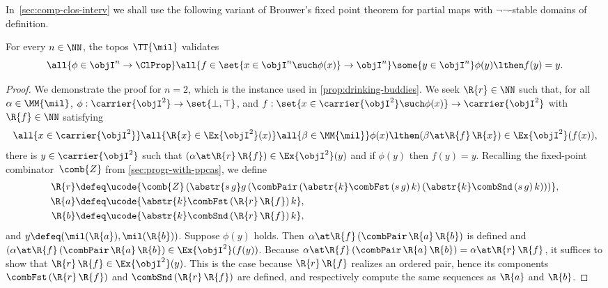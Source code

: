 In~\cref{sec:comp-clos-interv} we shall use the following variant of Brouwer's fixed point theorem for partial maps with $\neg\neg$-stable domains of definition.

\begin{theorem}
  \label{thm:partial-brouwer}%
  For every $n \in \NN$, the topos $\TT{\mil}$ validates
  \begin{equation*}
    \all{\phi \in \objI^n \to \ClProp}
    \all{f \in {\set{x \in \objI^n \such \phi(x)}} \to \objI^n}
    \some{y \in \objI^n}
    \phi(y) \lthen f(y) = y.
  \end{equation*}
\end{theorem}

\begin{proof}
  We demonstrate the proof for $n = 2$, which is the instance used in \cref{prop:drinking-buddies}.
  We seek $\R{r} \in \NN$ such that, for all $\alpha \in \MM{\mil}$,
  $\phi : \carrier{\objI^2} \to \set{\bot, \top}$, and
  $f : \set{x \in \carrier{\objI^2} \such \phi(x)} \to \carrier{\objI^2}$
  with $\R{f} \in \NN$ satisfying
  \begin{equation*}
    \all{x \in \carrier{\objI^2}}
    \all{\R{x} \in \Ex{\objI^2}(x)}
    \all{\beta \in \MM{\mil}}
    \phi(x) \lthen (\beta \at \R{f} \, \R{x}) \in \Ex{\objI^2}(f(x)),
  \end{equation*}
  there is $y \in \carrier{\objI^2}$ such that $(\alpha \at \R{r} \, \R{f}) \in \Ex{\objI^2}(y)$ and if $\phi(y)$ then $f(y) = y$. Recalling the fixed-point combinator~$\comb{Z}$ from \cref{sec:progr-with-ppcas}, we define
  \begin{align*}
    \R{r} &\defeq \ucode{\comb{Z} \,
                (\abstr{s \, g} g \,
                    (\combPair \,
                      (\abstr{k} \combFst \, (s \, g) \, k) \,
                      (\abstr{k} \combSnd \, (s \, g) \, k)%
                    )
                )},\\
    \R{a} &\defeq \ucode{\abstr{k} \combFst \, (\R{r} \, \R{f}) \, k},\\
    \R{b} &\defeq \ucode{\abstr{k} \combSnd \, (\R{r} \, \R{f}) \, k},
  \end{align*}
  and $y \defeq (\mil(\R{a}), \mil(\R{b}))$.
  Suppose $\phi(y)$ holds. Then
  $\alpha \at \R{f} \, (\combPair \, \R{a} \, \R{b})$ is defined and
  $(\alpha \at \R{f} \, (\combPair \, \R{a} \, \R{b}) \in \Ex{\objI^2}(f(y))$.
  Because $\alpha \at \R{f} \, (\combPair \, \R{a} \, \R{b}) = \alpha \at \R{r} \, \R{f}$,
  it suffices to show that $\R{r} \, \R{f} \in \Ex{\objI^2}(y)$.
  This is the case because $\R{r} \, \R{f}$ realizes an ordered pair, hence its components
  $\combFst \, (\R{r} \, \R{f})$ and $\combSnd \, (\R{r} \, \R{f})$ are defined, and respectively
  compute the same sequences as $\R{a}$ and $\R{b}$.
\end{proof}

